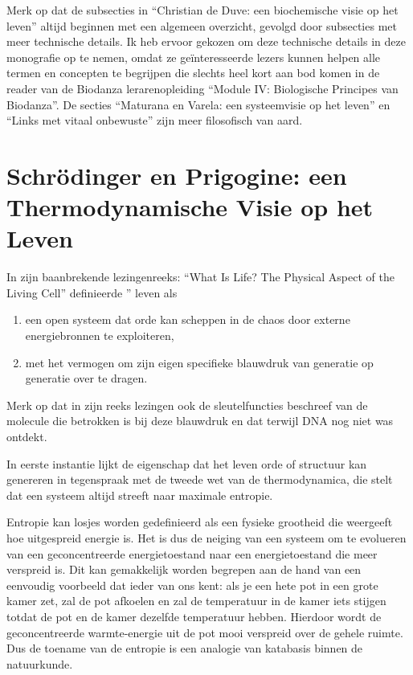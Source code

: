 \documentclass[
  11pt,
]{book}
\begin{document}
Merk op dat de subsecties in ``Christian de Duve: een biochemische visie op het leven'' altijd beginnen met een algemeen overzicht, gevolgd door subsecties met meer technische details. Ik heb ervoor gekozen om deze technische details in deze monografie op te nemen, omdat ze geïnteresseerde lezers kunnen helpen alle termen en concepten te begrijpen die slechts heel kort aan bod komen in de reader van de Biodanza lerarenopleiding ``Module IV: Biologische Principes van Biodanza''. De secties ``Maturana en Varela: een systeemvisie op het leven'' en ``Links met vitaal onbewuste'' zijn meer filosofisch van aard.

\newpage

\hypertarget{schruxf6dinger-en-prigogine-een-thermodynamische-visie-op-het-leven}{%
\section{Schrödinger en Prigogine: een Thermodynamische Visie op het Leven}\label{schruxf6dinger-en-prigogine-een-thermodynamische-visie-op-het-leven}}

In zijn baanbrekende lezingenreeks: ``What Is Life? The Physical Aspect of the Living Cell'' definieerde '' \citet{schrodinger1944} leven als

\begin{enumerate}
\def\labelenumi{\arabic{enumi}.}
\item
  een open systeem dat orde kan scheppen in de chaos door externe energiebronnen te exploiteren,
\item
  met het vermogen om zijn eigen specifieke blauwdruk van generatie op generatie over te dragen.
\end{enumerate}

Merk op dat \citet{schrodinger1944} in zijn reeks lezingen ook de sleutelfuncties beschreef van de molecule die betrokken is bij deze blauwdruk en dat terwijl DNA nog niet was ontdekt.

In eerste instantie lijkt de eigenschap dat het leven orde of structuur kan genereren in tegenspraak met de tweede wet van de thermodynamica, die stelt dat een systeem altijd streeft naar maximale entropie.

Entropie kan losjes worden gedefinieerd als een fysieke grootheid die weergeeft hoe uitgespreid energie is. Het is dus de neiging van een systeem om te evolueren van een geconcentreerde energietoestand naar een energietoestand die meer verspreid is. Dit kan gemakkelijk worden begrepen aan de hand van een eenvoudig voorbeeld dat ieder van ons kent: als je een hete pot in een grote kamer zet, zal de pot afkoelen en zal de temperatuur in de kamer iets stijgen totdat de pot en de kamer dezelfde temperatuur hebben. Hierdoor wordt de geconcentreerde warmte-energie uit de pot mooi verspreid over de gehele ruimte. Dus de toename van de entropie is een analogie van katabasis binnen de natuurkunde.
\end{document}
